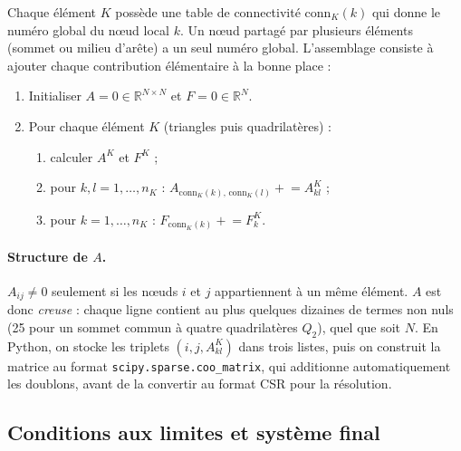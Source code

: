 \documentclass[11pt,a4paper]{article}
\begin{document}
Chaque élément $K$ possède une table de connectivité
$\mathrm{conn}_K(k)$ qui donne le numéro global du nœud local $k$. Un nœud
partagé par plusieurs éléments (sommet ou milieu d'arête) a un seul numéro
global. L'assemblage consiste à ajouter chaque contribution élémentaire à
la bonne place :
\begin{enumerate}
  \item Initialiser $A = 0 \in \mathbb{R}^{N \times N}$ et
        $F = 0 \in \mathbb{R}^{N}$.
  \item Pour chaque élément $K$ (triangles puis quadrilatères) :
        \begin{enumerate}
          \item calculer $A^K$ et $F^K$ ;
          \item pour $k, l = 1, \dots, n_K$ :
                $A_{\mathrm{conn}_K(k),\,\mathrm{conn}_K(l)} \mathrel{+}= A^K_{kl}$ ;
          \item pour $k = 1, \dots, n_K$ :
                $F_{\mathrm{conn}_K(k)} \mathrel{+}= F^K_k$.
        \end{enumerate}
\end{enumerate}

\paragraph{Structure de $A$.} $A_{ij} \neq 0$ seulement si les nœuds $i$ et
$j$ appartiennent à un même élément. $A$ est donc \emph{creuse} : chaque
ligne contient au plus quelques dizaines de termes non nuls (25 pour un
sommet commun à quatre quadrilatères $Q_2$), quel que soit $N$. En Python,
on stocke les triplets $(i, j, A^K_{kl})$ dans trois listes, puis on
construit la matrice au format \texttt{scipy.sparse.coo\_matrix}, qui
additionne automatiquement les doublons, avant de la convertir au format
CSR pour la résolution.

\subsection{Conditions aux limites et système final}
\label{sec:dirichlet}
\end{document}
